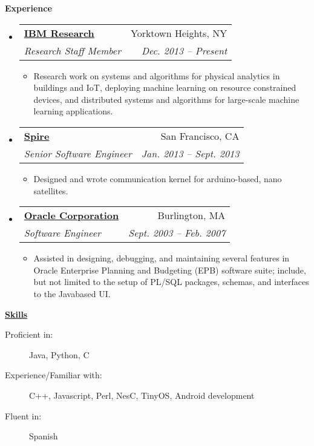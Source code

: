 \documentclass[letterpaper,11pt]{article}
\makeatletter
\newcommand{\resitem}[1]{\item #1 \vspace{-2pt}}
\newcommand{\resheading}[1]{{\large \colorbox{mygrey}{\begin{minipage}{\textwidth}{\textbf{#1 \vphantom{p\^{E}}}}\end{minipage}}}}
\newcommand{\ressubheading}[4]{
\begin{tabular*}{6.5in}{l@{\extracolsep{\fill}}r}
		\textbf{#1} & #2 \\
		\textit{#3} & \textit{#4} \\
\end{tabular*}\vspace{-6pt}}
\makeatother
\begin{document}
\resheading{Experience}
	\begin{itemize}

        \item 
			\ressubheading{\href{http://www.research.ibm.com/}{IBM Research}}{Yorktown Heights, NY}
				{Research Staff Member}{Dec. 2013 -- Present}
				{ \footnotesize
				\begin{itemize}
                    \resitem{Research work on systems and algorithms for physical analytics in buildings and IoT, deploying machine learning on resource constrained devices, and distributed systems and algorithms for large-scale machine learning applications.}
				\end{itemize}
				}


        \item 
			\ressubheading{\href{https://spire.com/}{Spire}}{San Francisco, CA}
				{Senior Software Engineer}{Jan. 2013 -- Sept. 2013}
				{ \footnotesize
				\begin{itemize}
                    \resitem{Designed and wrote communication kernel for arduino-based, nano satellites.}
				\end{itemize}
				}

		\item 
			\ressubheading{\href{http://www.oracle.com}{Oracle Corporation}}{Burlington, MA}
				{Software Engineer}{Sept. 2003 -- Feb. 2007}
				{ \footnotesize
				\begin{itemize}
                    \resitem{Assisted in designing, debugging, and maintaining several features in Oracle Enterprise Planning and Budgeting (EPB) software suite; include, but not limited to the setup of PL/SQL packages, schemas, and interfaces to the Java\-based UI.}
				\end{itemize}
				}

				
		
\end{itemize}  %

\resheading{\href{}{Skills}}
	\begin{description}
		\item[Proficient in:]{Java, Python, C
		}
		\item[Experience/Familiar with:]{ 
            C++, Javascript, Perl, NesC, TinyOS, Android development
		}
        \item[Fluent in:] { 
            Spanish
		}
	\end{description} %
\end{document}
